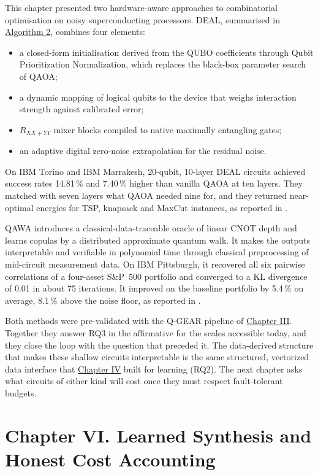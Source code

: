 \documentclass{report}
\theoremstyle{plain}
\theoremstyle{definition}
\theoremstyle{remark}
\begin{document}
This chapter presented two hardware-aware approaches to combinatorial optimisation on noisy superconducting processors. DEAL, summarised in \hyperref[alg:deal]{Algorithm 2}, combines four elements:
\begin{itemize}
\item a closed-form initialisation derived from the QUBO coefficients through Qubit Prioritization Normalization, which replaces the black-box parameter search of QAOA;
\item a dynamic mapping of logical qubits to the device that weighs interaction strength against calibrated error;
\item $R_{XX+YY}$ mixer blocks compiled to native maximally entangling gates;
\item an adaptive digital zero-noise extrapolation for the residual noise.
\end{itemize}
On IBM Torino and IBM Marrakesh, 20-qubit, 10-layer DEAL circuits achieved success rates 14.81 \% and 7.40 \% higher than vanilla QAOA at ten layers. They matched with seven layers what QAOA needed nine for, and they returned near-optimal energies for TSP, knapsack and MaxCut instances, as reported in \cite{guo2025deal}.

QAWA introduces a classical-data-traceable oracle of linear CNOT depth and learns copulas by a distributed approximate quantum walk. It makes the outputs interpretable and verifiable in polynomial time through classical preprocessing of mid-circuit measurement data. On IBM Pittsburgh, it recovered all six pairwise correlations of a four-asset S\&P~500 portfolio and converged to a KL divergence of 0.01 in about 75 iterations. It improved on the baseline portfolio by 5.4 \% on average, 8.1 \% above the noise floor, as reported in \cite{guo2025qawa}.

Both methods were pre-validated with the Q-GEAR pipeline of \hyperref[ch:qgear]{Chapter III}. Together they answer RQ3 in the affirmative for the scales accessible today, and they close the loop with the question that preceded it. The data-derived structure that makes these shallow circuits interpretable is the same structured, vectorized data interface that \hyperref[ch:qml]{Chapter IV} built for learning (RQ2). The next chapter asks what circuits of either kind will cost once they must respect fault-tolerant budgets.


\chapter{Chapter VI. Learned Synthesis and Honest Cost Accounting}\label{ch:synthesis}
\end{document}
